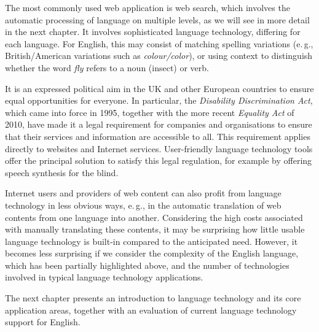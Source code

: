 \documentclass[]{../../metanetpaper}
\begin{document}
\begin{multicols}{2}
The most commonly used web application is web search, which involves the automatic processing of language on multiple levels, as we will see in more detail in the next chapter. It involves sophisticated language technology, differing for each language. For English, this may consist of matching spelling variations (e.\,g., British/American variations such as \textit{colour/color}), or using context to distinguish whether the word \textit{fly} refers to a noun (insect) or verb.
  
It is an expressed political aim in the UK and other European countries to ensure equal opportunities for everyone. In particular, the \textit{Disability Discrimination Act}, which came into force in 1995, together with the more recent \textit{Equality Act} of 2010, have made it a legal requirement for companies and organisations to ensure that their services and information are accessible to all. This requirement applies directly to websites and Internet services. User-friendly language technology tools offer the principal solution to satisfy this legal regulation, for example by offering speech synthesis for the blind.
  
Internet users and providers of web content can also profit from language technology in less obvious ways, e.\,g., in the automatic translation of web contents from one language into another. Considering the high costs associated with manually translating these contents, it may be surprising how little usable language technology is built-in compared to the anticipated need. However, it becomes less surprising if we consider the complexity of the English language, which has been partially highlighted above, and the number of technologies involved in typical language technology applications. 


The next chapter presents an introduction to language technology and its core application areas, together with an evaluation of current language technology support for English.
\end{multicols}

\clearpage

\end{document}
